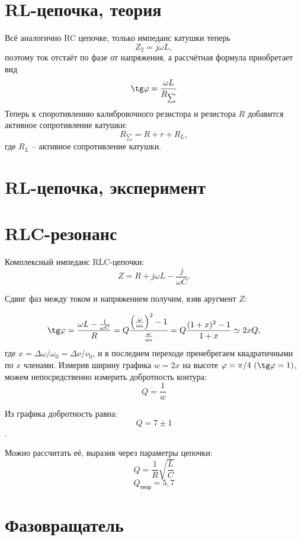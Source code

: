 \documentclass[a4paper, 12pt]{article}
\begin{document}
\section*{RL-цепочка, теория}
Всё аналогично RC цепочке, только импеданс катушки теперь 
$$Z_2 = j\omega L,$$
поэтому ток отстаёт по фазе от напряжения, а рассчётная формула приобретает вид
$$\tg\varphi = \frac{\omega L}{R_{\sum}}$$
Теперь к споротивлению калибровочного резистора и резистора $R$ добавится активное сопротивление катушки:
$$R_{\sum} = R+r+R_L,$$
где $R_L$ -- активное сопротивление катушки.

\section*{RL-цепочка, эксперимент}
\begin {figure}[H]
\begin{center}
{}
\end{center}
\end {figure}

\section*{RLC-резонанс}

Комплексный импеданс RLC-цепочки:
$$Z=R+j\omega L - \frac{j}{\omega C}.$$

Сдвиг фаз между током и напряжением получим, взяв аругмент $Z$:

$$\tg\varphi = \frac{\omega L - \frac{1}{\omega C}}{R} = Q\frac{\left(\frac{\omega}{\omega_0}\right)^2 - 1}{\frac{\omega}{\omega_0}} = Q\frac{(1+x)^2-1}{1+x} \simeq 2x Q,$$
где $x = \Delta \omega / \omega_0 = \Delta \nu / \nu_0$, и в последнем переходе пренебрегаем квадратичными по $x$ членами.
Измерив ширину графика $w=2x$ на высоте $\varphi = \pi / 4\ (\tg\varphi = 1)$, можем непосредственно измерить добротность контура:
$$Q = \frac{1}{w}$$

\begin {figure}[H]
\begin{center}
{}
\end{center}
\end {figure}



Из графика добротность равна:
$$Q=7\pm1$$.

Можно рассчитать её, выразив через параметры цепочки:
$$Q = \frac{1}{R} \sqrt{\frac{L}{C}}$$
$$Q_{\text{теор}} = 5,7$$

\section*{Фазовращатель}
\end{document}
